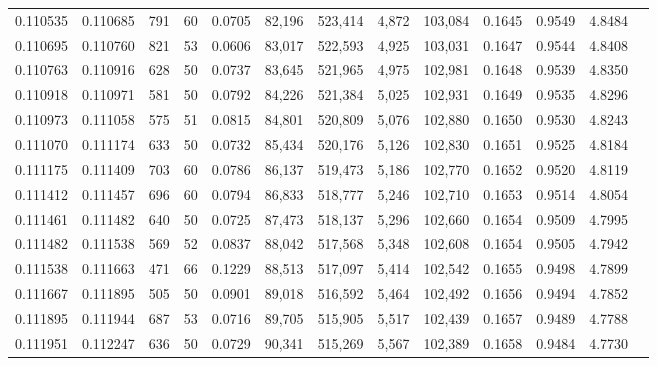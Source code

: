 \begin{tabular}{rrrrrrrrrrrrr}
0.110535 & 0.110685 &   791 &  60 &                                     0.0705 &  82,196 & 523,414 &   4,872 & 103,084 & 0.1645 & 0.9549 & 4.8484 \\
0.110695 & 0.110760 &   821 &  53 &                                     0.0606 &  83,017 & 522,593 &   4,925 & 103,031 & 0.1647 & 0.9544 & 4.8408 \\
0.110763 & 0.110916 &   628 &  50 &                                     0.0737 &  83,645 & 521,965 &   4,975 & 102,981 & 0.1648 & 0.9539 & 4.8350 \\
0.110918 & 0.110971 &   581 &  50 &                                     0.0792 &  84,226 & 521,384 &   5,025 & 102,931 & 0.1649 & 0.9535 & 4.8296 \\
0.110973 & 0.111058 &   575 &  51 &                                     0.0815 &  84,801 & 520,809 &   5,076 & 102,880 & 0.1650 & 0.9530 & 4.8243 \\
0.111070 & 0.111174 &   633 &  50 &                                     0.0732 &  85,434 & 520,176 &   5,126 & 102,830 & 0.1651 & 0.9525 & 4.8184 \\
0.111175 & 0.111409 &   703 &  60 &                                     0.0786 &  86,137 & 519,473 &   5,186 & 102,770 & 0.1652 & 0.9520 & 4.8119 \\
0.111412 & 0.111457 &   696 &  60 &                                     0.0794 &  86,833 & 518,777 &   5,246 & 102,710 & 0.1653 & 0.9514 & 4.8054 \\
0.111461 & 0.111482 &   640 &  50 &                                     0.0725 &  87,473 & 518,137 &   5,296 & 102,660 & 0.1654 & 0.9509 & 4.7995 \\
0.111482 & 0.111538 &   569 &  52 &                                     0.0837 &  88,042 & 517,568 &   5,348 & 102,608 & 0.1654 & 0.9505 & 4.7942 \\
0.111538 & 0.111663 &   471 &  66 &                                     0.1229 &  88,513 & 517,097 &   5,414 & 102,542 & 0.1655 & 0.9498 & 4.7899 \\
0.111667 & 0.111895 &   505 &  50 &                                     0.0901 &  89,018 & 516,592 &   5,464 & 102,492 & 0.1656 & 0.9494 & 4.7852 \\
0.111895 & 0.111944 &   687 &  53 &                                     0.0716 &  89,705 & 515,905 &   5,517 & 102,439 & 0.1657 & 0.9489 & 4.7788 \\
0.111951 & 0.112247 &   636 &  50 &                                     0.0729 &  90,341 & 515,269 &   5,567 & 102,389 & 0.1658 & 0.9484 & 4.7730 \\

\end{tabular}

